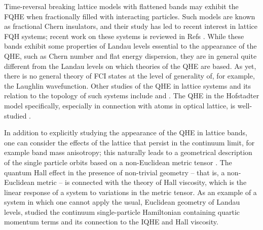 \documentclass[aps,twocolumn,letterpaper,twoside,nobalancelastpage,groupedaddress,amsmath,amssymb,floatfix,citeautoscript]{revtex4-1}
\begin{document}
 Time-reversal breaking lattice models with flattened bands may exhibit the FQHE when fractionally filled with interacting particles. Such models are known as fractional Chern insulators, and their study has led to recent interest in lattice FQH systems; recent work on these systems is reviewed in Refs \cite{Parameswaran:2013uf,Bergholtz:2013ue}. While these bands exhibit some properties of Landau levels essential to the appearance of the QHE, such as Chern number and flat energy dispersion, they are in general quite different from the Landau levels on which theories of the QHE are based. As yet, there is no general theory of FCI states at the level of generality of, for example, the Laughlin wavefunction. Other studies of the QHE in lattice systems and its relation to the topology of such systems include \textcite{Thouless:1982kq} and \textcite{Haldane:1988gh}. The QHE in the Hofstadter model specifically, especially in connection with atoms in optical lattice, is well-studied \cite{Sorensen:2005bt,Palmer:2006km,Hafezi:2007gz,Moller:2009ir,Kapit:2010ky,Sterdyniak:2012jo,Scaffidi:2014tg,Harper:2014vi}.

 

In addition to explicitly studying the appearance of the QHE in lattice bands, one can consider the effects of the lattice that persist in the continuum limit, for example band mass anisotropy; this naturally leads to a geometrical description of the single particle orbits based on a non-Euclidean metric tensor \cite{Yang:2012ab,Haldane:2016aa}. The quantum Hall effect in the presence of non-trivial geometry -- that is, a non-Euclidean metric -- is connected with the theory of Hall viscosity, which is the linear response of a system to variations in the metric tensor\cite{Avron:1995aa,Cho:2014aa}. As an example of a system in which one cannot apply the usual, Euclidean geometry of Landau levels, \textcite{Haldane:2016aa} studied the continuum single-particle Hamiltonian containing quartic momentum terms and its connection to the IQHE and Hall viscosity.

\end{document}
